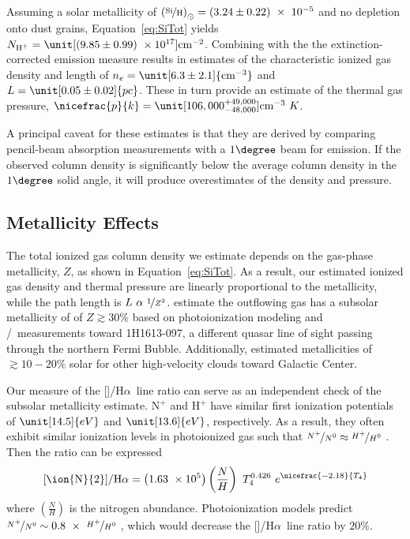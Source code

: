 \documentclass[twocolumn]{aastex63}
\newcommand{\hi}{\ion{H}{1}}
\newcommand{\nii}{\ion{N}{2}}
\newcommand{\ha}{H\ensuremath{\alpha}}
\begin{document}
Assuming a solar metallicity of $\left( \nicefrac{\textrm{Si}}{\textrm{H}} \right)_{\odot} = \left( 3.24 \pm 0.22 \right)~\times~10^{-5}$ \citep{Asplund2009} and no depletion onto dust grains, Equation~\ref{eq:SiTot} yields $N_{\textrm{H}^+} = \unit[\left(9.85 \pm 0.99\right)~\times 10^{17}]{\textrm{cm}^{-2}}$. 
Combining with the the extinction-corrected emission measure results in estimates of the characteristic ionized gas density and length of $n_{e} = \unit[6.3 \pm 2.1]{\textrm{cm}^{-3}}$ and $L = \unit[0.05 \pm 0.02]{pc}$.
These in turn provide an estimate of the thermal gas pressure, $\nicefrac{p}{k} = \unit[106,000^{+49,000}_{-48,000}]{\textrm{cm}^{-3}~K}$.

A principal caveat for these estimates is that they are derived by comparing pencil-beam absorption measurements with a $1\degree$ beam for emission. If the observed column density is significantly below the average column density in the $1\degree$ solid angle, it will produce overestimates of the density and pressure. 

\subsection{Metallicity Effects}
The total ionized gas column density we estimate depends on the gas-phase metallicity, $Z$, as shown in Equation~\ref{eq:SiTot}. As a result, our estimated ionized gas density and thermal pressure are linearly proportional to the metallicity, while the path length is $L~\alpha~\nicefrac{1}{Z^2}$. \citet{Bordoloi2017} estimate the outflowing gas has a subsolar metallicity of of $Z \gtrsim 30\%$ based on photoionization modeling and /\hi\ measurements toward 1H1613-097, a different quasar line of sight passing through the northern Fermi Bubble. Additionally, \citet{Keeney2006} estimated metallicities of $\gtrsim 10-20\%$ solar for other high-velocity clouds toward Galactic Center.

Our measure of the [\nii]/\ha\ line ratio can serve as an independent check of the subsolar metallicity estimate. $\textrm{N}^{+}$ and $\textrm{H}^+$ have similar first ionization potentials of $\unit[14.5]{eV}$ and $\unit[13.6]{eV}$, respectively. As a result, they often exhibit similar ionization levels in photoionized gas such that $\nicefrac{N^+}{N^0} \approx \nicefrac{H^+}{H^0}$ \citep{Haffner1999}. Then the ratio can be expressed 
\begin{equation}
    \textrm{[\nii]/\ha} = \left(1.63~\times10^5\right) \left(\frac{N}{H}\right)~T_4^{0.426}~e^{\nicefrac{-2.18}{T_4}} \label{eq:niiha}
\end{equation}
where $\left(\frac{N}{H}\right)$ is the nitrogen abundance. Photoionization models predict $\nicefrac{N^+}{N^0} \sim 0.8~\times~\nicefrac{H^+}{H^0}$ \citep{Sembach2000}, which would decrease the [\nii]/\ha\ line ratio by $20\%$. 
\end{document}
